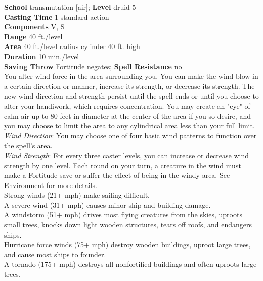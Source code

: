 \textbf{School} transmutation [air]; \textbf{Level} druid 5\\
\textbf{Casting Time} 1 standard action\\
\textbf{Components} V, S\\
\textbf{Range} 40 ft./level\\
\textbf{Area} 40 ft./level radius cylinder 40 ft. high\\
\textbf{Duration} 10 min./level\\
\textbf{Saving Throw} Fortitude negates; \textbf{Spell Resistance} no\\
You alter wind force in the area surrounding you. You can make the wind blow in a certain direction or manner, increase its strength, or decrease its strength. The new wind direction and strength persist until the spell ends or until you choose to alter your handiwork, which requires concentration. You may create an "eye" of calm air up to 80 feet in diameter at the center of the area if you so desire, and you may choose to limit the area to any cylindrical area less than your full limit.\\
\textit{Wind Direction}: You may choose one of four basic wind patterns to function over the spell's area.\\
\textit{Wind Strength}: For every three caster levels, you can increase or decrease wind strength by one level. Each round on your turn, a creature in the wind must make a Fortitude save or suffer the effect of being in the windy area. See Environment for more details.\\
Strong winds (21+ mph) make sailing difficult.\\
A severe wind (31+ mph) causes minor ship and building damage.\\
A windstorm (51+ mph) drives most flying creatures from the skies, uproots small trees, knocks down light wooden structures, tears off roofs, and endangers ships.\\
Hurricane force winds (75+ mph) destroy wooden buildings, uproot large trees, and cause most ships to founder.\\
A tornado (175+ mph) destroys all nonfortified buildings and often uproots large trees.\\
